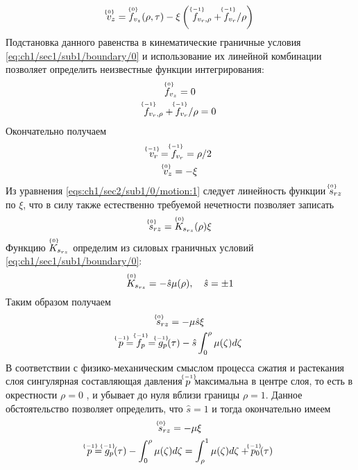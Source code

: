 \begin{equation*}
  \uindex{v}{0}_{z} = \uindex{f}{0}_{v_{z}}(\rho, \tau) -\xi \left(\ \uindex{f}{-1}_{v_{r},\rho} + \uindex{f}{-1}_{v_{r}} / \rho\right)
\end{equation*}
Подстановка данного равенства в кинематические граничные условия \cref{eq:ch1/sec1/sub1/boundary/0} и использование их линейной комбинации позволяет определить неизвестные функции интегрирования:
\begin{gather*}
  \uindex{f}{0}_{v_{z}} = 0\\
  \uindex{f}{-1}_{v_{r},\rho} + \uindex{f}{-1}_{v_{r}} / \rho = 0
\end{gather*}
Окончательно получаем
\begin{gather}
  \label{sol:ch1/sec2/sub1/vr/-1}
  \uindex{v}{-1}_{r} = \uindex{f}{-1}_{v_{r}} = \rho / 2
  \\
  \label{sol:ch1/sec2/sub1/vz/0}
  \uindex{v}{0}_{z} =  -\xi
\end{gather}
Из уравнения \cref{eqs:ch1/sec2/sub1/0/motion:1} следует линейность функции $\uindex{s}{0}_{rz}$ по $\xi$, что в силу также естественно требуемой нечетности позволяет записать
\begin{equation*}
  \uindex{s}{0}_{rz} = \uindex{K}{0}_{s_{rz}}(\rho) \xi
\end{equation*}
Функцию $\uindex{K}{0}_{s_{rz}}$ определим из силовых граничных условий \cref{eq:ch1/sec1/sub1/boundary/0}:
\begin{equation*}
  \uindex{K}{0}_{s_{rz}} = -\hat{s}\mu(\rho), \quad \hat{s} = \pm1
\end{equation*}
Таким образом получаем
\begin{gather*}
  \uindex{s}{0}_{rz} = -\mu \hat{s} \xi
  \\
  \uindex{p}{-1} = \uindex{f}{-1}_{p} = \uindex{g}{-1}_{p}(\tau) - \hat{s} \int_0^\rho \mu(\zeta) d\zeta
\end{gather*}
В соответствии с физико-механическим смыслом процесса сжатия и растекания слоя сингулярная составляющая давления $\uindex{p}{-1}$ максимальна в центре слоя, то есть в окрестности $\rho = 0$ , и убывает до нуля вблизи границы $\rho=1$. Данное обстоятельство позволяет определить, что $\hat{s} = 1$ и тогда окончательно имеем
\begin{gather}
  \label{sol:ch1/sec2/sub1/srz/0}
  \uindex{s}{0}_{rz} = -\mu \xi
  \\
  \label{sol:ch1/sec2/sub1/p/-1}
  \uindex{p}{-1} = \uindex{g}{-1}_{p}(\tau) - \int_0^\rho \mu(\zeta) d\zeta = \int_\rho^1 \mu(\zeta) d\zeta + \uindex{p}{-1}_{0}(\tau)
\end{gather}
